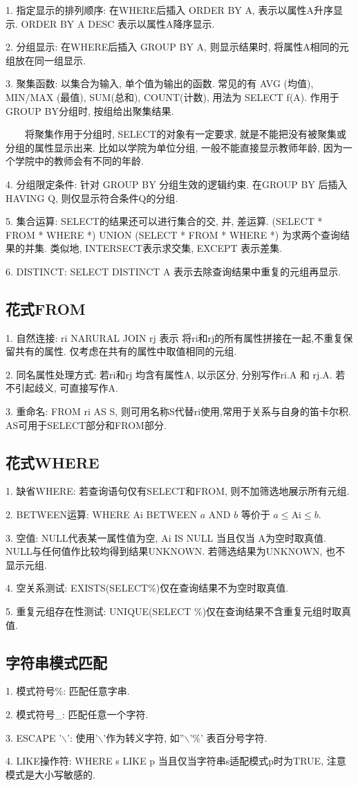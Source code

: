 1. 指定显示的排列顺序: 在WHERE后插入 ORDER BY A, 表示以属性A升序显示. ORDER BY A DESC 表示以属性A降序显示.

2. 分组显示: 在WHERE后插入 GROUP BY A, 则显示结果时, 将属性A相同的元组放在同一组显示.

3. 聚集函数: 以集合为输入, 单个值为输出的函数. 常见的有 AVG (均值), MIN/MAX (最值), SUM(总和), COUNT(计数), 用法为 SELECT f(A). 
作用于GROUP BY分组时, 按组给出聚集结果.

\begin{tcolorbox}[colback=gray!5,colframe=orange!75!black,title=注意事项]
    ~~~~将聚集作用于分组时, SELECT的对象有一定要求, 就是不能把没有被聚集或分组的属性显示出来. 比如以学院为单位分组, 
    一般不能直接显示教师年龄, 因为一个学院中的教师会有不同的年龄.
\end{tcolorbox}

4. 分组限定条件: 针对 GROUP BY 分组生效的逻辑约束. 在GROUP BY 后插入 HAVING Q, 则仅显示符合条件Q的分组.

5. 集合运算: SELECT的结果还可以进行集合的交, 并, 差运算. (SELECT * FROM * WHERE *) UNION (SELECT * FROM * WHERE *)
为求两个查询结果的并集. 类似地, INTERSECT表示求交集, EXCEPT 表示差集.

6. DISTINCT: SELECT DISTINCT A 表示去除查询结果中重复的元组再显示.

\subsection{花式FROM}

1. 自然连接: ri NARURAL JOIN rj 表示 将ri和rj的所有属性拼接在一起,不重复保留共有的属性. 仅考虑在共有的属性中取值相同的元组.

2. 同名属性处理方式: 若ri和rj 均含有属性A, 以示区分, 分别写作ri.A 和 rj.A. 若不引起歧义, 可直接写作A.

3. 重命名: FROM ri AS S, 则可用名称S代替ri使用,常用于关系与自身的笛卡尔积. AS可用于SELECT部分和FROM部分.

\subsection{花式WHERE}

1. 缺省WHERE: 若查询语句仅有SELECT和FROM, 则不加筛选地展示所有元组.

2. BETWEEN运算: WHERE Ai BETWEEN $a$ AND $b$ 等价于 $a \leq \text{Ai} \leq b$.

3. 空值: NULL代表某一属性值为空, Ai IS NULL 当且仅当 A为空时取真值. NULL与任何值作比较均得到结果UNKNOWN. 若筛选结果为UNKNOWN, 也不显示元组.

4. 空关系测试: EXISTS(SELECT\%)仅在查询结果不为空时取真值.

5. 重复元组存在性测试: UNIQUE(SELECT \%)仅在查询结果不含重复元组时取真值.

\subsection{字符串模式匹配}

1. 模式符号\%: 匹配任意字串.

2. 模式符号\_: 匹配任意一个字符.

3. ESCAPE '$\backslash$': 使用'$\backslash$'作为转义字符, 如''$\backslash$'\%' 表百分号字符.

4. LIKE操作符: WHERE s LIKE p 当且仅当字符串s适配模式p时为TRUE, 注意模式是大小写敏感的.